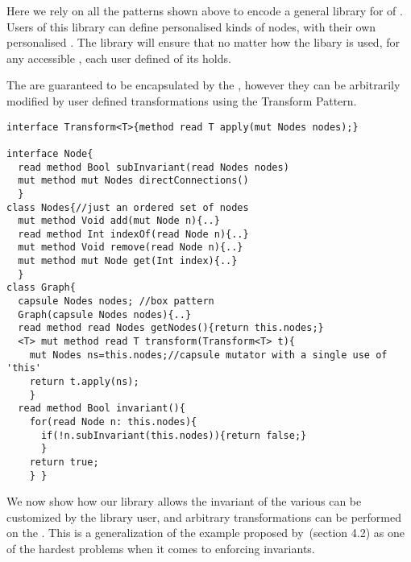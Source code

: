 

Here we rely on all the patterns shown above to encode a general library for \Q@Graph@s
of \Q@Node@s.
Users of this library can define personalised kinds of nodes,
with their own personalised \Q@subInvariant@.
The library will ensure that no matter how the libary is used, for any accessible \Q@Graph@, each user defined \Q@subInvariant@ of its \Q@Node@s holds.

The \Q@Node@s are guaranteed to be encapsulated by the \Q@Graph@, however they can be arbitrarily modified by user defined transformations using the Transform Pattern.
\begin{lstlisting}
interface Transform<T>{method read T apply(mut Nodes nodes);}

interface Node{
  read method Bool subInvariant(read Nodes nodes)
  mut method mut Nodes directConnections()
  }
class Nodes{//just an ordered set of nodes 
  mut method Void add(mut Node n){..}
  read method Int indexOf(read Node n){..}
  mut method Void remove(read Node n){..}
  mut method mut Node get(Int index){..}
  }
class Graph{ 
  capsule Nodes nodes; //box pattern
  Graph(capsule Nodes nodes){..}
  read method read Nodes getNodes(){return this.nodes;}
  <T> mut method read T transform(Transform<T> t){
    mut Nodes ns=this.nodes;//capsule mutator with a single use of 'this'
    return t.apply(ns);
    }
  read method Bool invariant(){
    for(read Node n: this.nodes){
      if(!n.subInvariant(this.nodes)){return false;}
      }
    return true;
    } }
\end{lstlisting}
We now show how our \Q@Graph@ library allows the invariant of the various \Q@Node@s can be customized by the library user, and arbitrary transformations can be performed on the \Q@Graph@s. This is a generalization of the example proposed by~\cite{Summers:2009:NFO:1562154.1562160}(section 4.2) as one of the hardest problems when it comes to enforcing invariants.

